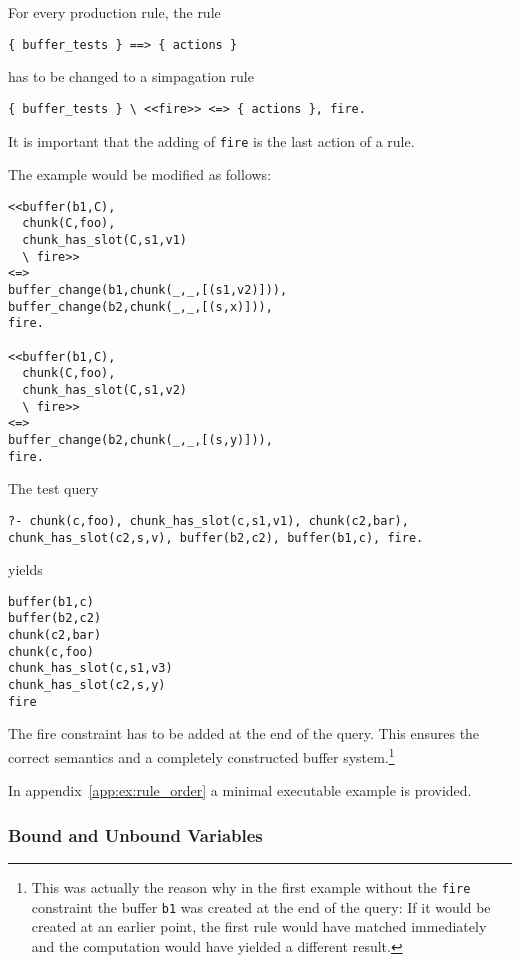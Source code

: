 For every production rule, the rule

\begin{lstlisting}
{ buffer_tests } ==> { actions }
\end{lstlisting}

has to be changed to a simpagation rule

\begin{lstlisting}
{ buffer_tests } \ <<fire>> <=> { actions }, fire.
\end{lstlisting}

It is important that the adding of \lstinline|fire| is the last action of a rule.

The example would be modified as follows:

\begin{lstlisting}
<<buffer(b1,C),
  chunk(C,foo),
  chunk_has_slot(C,s1,v1)
  \ fire>>
<=>
buffer_change(b1,chunk(_,_,[(s1,v2)])),
buffer_change(b2,chunk(_,_,[(s,x)])),
fire.

<<buffer(b1,C),
  chunk(C,foo),
  chunk_has_slot(C,s1,v2)
  \ fire>>
<=>
buffer_change(b2,chunk(_,_,[(s,y)])),
fire.
\end{lstlisting}


The test query

\begin{lstlisting}
?- chunk(c,foo), chunk_has_slot(c,s1,v1), chunk(c2,bar), chunk_has_slot(c2,s,v), buffer(b2,c2), buffer(b1,c), fire.
\end{lstlisting}

yields

\begin{lstlisting}
buffer(b1,c)
buffer(b2,c2)
chunk(c2,bar)
chunk(c,foo)
chunk_has_slot(c,s1,v3)
chunk_has_slot(c2,s,y)
fire
\end{lstlisting}

The fire constraint has to be added at the end of the query. This ensures the correct semantics and a completely constructed buffer system.\footnote{This was actually the reason why in the first example without the \texttt{fire} constraint the buffer \texttt{b1} was created at the end of the query: If it would be created at an earlier point, the first rule would have matched immediately and the computation would have yielded a different result.}

In appendix~\ref{app:ex:rule_order} a minimal executable example is provided.

\subsubsection{Bound and Unbound Variables}
\label{bound_and_unbound_variables}

